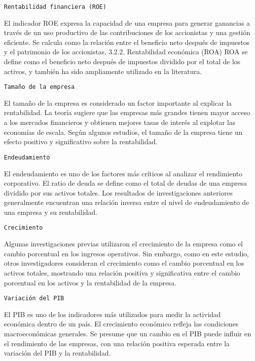 \documentclass[
]{article}
\begin{document}
\begin{verbatim}
Rentabilidad financiera (ROE)
\end{verbatim}

El indicador ROE expresa la capacidad de una empresa para generar
ganancias a través de un uso productivo de las contribuciones de los
accionistas y una gestión eficiente. Se calcula como la relación entre
el beneficio neto después de impuestos y el patrimonio de los
accionistas. 3.2.2. Rentabilidad económica (ROA) ROA se define como el
beneficio neto después de impuestos dividido por el total de los
activos, y también ha sido ampliamente utilizado en la literatura.

\begin{verbatim}
Tamaño de la empresa
\end{verbatim}

El tamaño de la empresa es considerado un factor importante al explicar
la rentabilidad. La teoría sugiere que las empresas más grandes tienen
mayor acceso a los mercados financieros y obtienen mejores tasas de
interés al explotar las economías de escala. Según algunos estudios, el
tamaño de la empresa tiene un efecto positivo y significativo sobre la
rentabilidad.

\begin{verbatim}
Endeudamiento
\end{verbatim}

El endeudamiento es uno de los factores más críticos al analizar el
rendimiento corporativo. El ratio de deuda se define como el total de
deudas de una empresa dividido por sus activos totales. Los resultados
de investigaciones anteriores generalmente encuentran una relación
inversa entre el nivel de endeudamiento de una empresa y su
rentabilidad.

\begin{verbatim}
Crecimiento
\end{verbatim}

Algunas investigaciones previas utilizaron el crecimiento de la empresa
como el cambio porcentual en los ingresos operativos. Sin embargo, como
en este estudio, otros investigadores consideran el crecimiento como el
cambio porcentual en los activos totales, mostrando una relación
positiva y significativa entre el cambio porcentual en los activos y la
rentabilidad de la empresa.

\begin{verbatim}
Variación del PIB
\end{verbatim}

El PIB es uno de los indicadores más utilizados para medir la actividad
económica dentro de un país. El crecimiento económico refleja las
condiciones macroeconómicas generales. Se presume que un cambio en el
PIB puede influir en el rendimiento de las empresas, con una relación
positiva esperada entre la variación del PIB y la rentabilidad.
\end{document}
